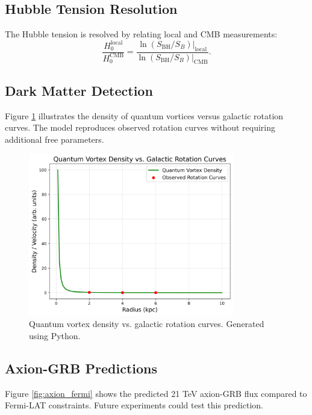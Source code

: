 \documentclass[12pt,a4paper]{article}
\begin{document}
\subsection{Hubble Tension Resolution}
The Hubble tension is resolved by relating local and CMB measurements:
\[
\frac{H_0^{\text{local}}}{H_0^{\text{CMB}}} = \frac{\ln(S_{\text{BH}}/S_B)|_{\text{local}}}{\ln(S_{\text{BH}}/S_B)|_{\text{CMB}}}.
\]

\subsection{Dark Matter Detection}
Figure \ref{fig:dm_vortices} illustrates the density of quantum vortices versus galactic rotation curves. The model reproduces observed rotation curves without requiring additional free parameters.

\begin{figure}[h]
\centering
\includegraphics[width=0.8\textwidth]{dm_vortices.png}
\caption{Quantum vortex density vs. galactic rotation curves. Generated using Python.}
\label{fig:dm_vortices}
\end{figure}

\subsection{Axion-GRB Predictions}
Figure \ref{fig:axion_fermi} shows the predicted 21 TeV axion-GRB flux compared to Fermi-LAT constraints. Future experiments could test this prediction.
\end{document}
